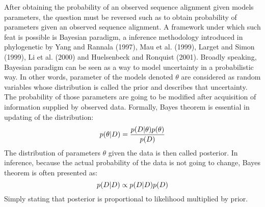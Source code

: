 After obtaining the probability of an observed sequence alignment given models parameters, the question must be reversed such as to obtain probability of parameters given an observed sequence alignment.
A framework under which such feat is possible is Bayesian paradigm, a inference methodology introduced in phylogenetic by Yang and Rannala (1997), Mau et al. (1999), Larget and Simon (1999), Li et al. (2000) and Huelsenbeck and Ronquist (2001).
Broadly speaking, Bayesian paradigm can be seen as a way to model uncertainty in a probabilistic way.
In other words, parameter of the models denoted $\theta$ are considered as random variables whose distribution is called the \gls{prior} and describes that uncertainty.
The probability of those parameters are going to be modified after acquisition of information supplied by observed data.
Formally, Bayes theorem is essential in updating of the distribution:
\begin{equation}
    p(\theta|D)=\frac{p(D|\theta)p(\theta)}{p(D)}
\end{equation}
The distribution of parameters $\theta$ given the data is then called \gls{posterior}.
In inference, because the actual probability of the data is not going to change, Bayes theorem is often presented as:
\begin{equation}
    p(D|D) \propto p(D|D)p(D)
\end{equation}
Simply stating that \gls{posterior} is proportional to \gls{likelihood} multiplied by \gls{prior}.

